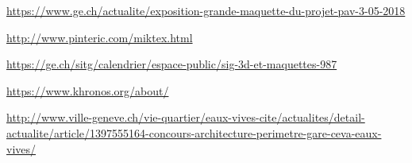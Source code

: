 
\begin{thebibliography}{9}

 \url{https://www.ge.ch/actualite/exposition-grande-maquette-du-projet-pav-3-05-2018}

 \url{http://www.pinteric.com/miktex.html}

 \url{https://ge.ch/sitg/calendrier/espace-public/sig-3d-et-maquettes-987}

 \url{https://www.khronos.org/about/}


\url{http://www.ville-geneve.ch/vie-quartier/eaux-vives-cite/actualites/detail-actualite/article/1397555164-concours-architecture-perimetre-gare-ceva-eaux-vives/}

\end{thebibliography}
